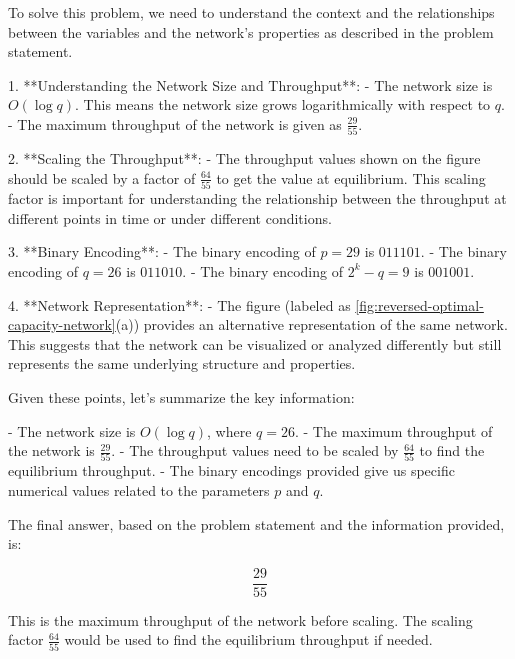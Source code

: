 To solve this problem, we need to understand the context and the relationships between the variables and the network's properties as described in the problem statement.

1. **Understanding the Network Size and Throughput**:
   - The network size is \( O(\log q) \). This means the network size grows logarithmically with respect to \( q \).
   - The maximum throughput of the network is given as \( \frac{29}{55} \).

2. **Scaling the Throughput**:
   - The throughput values shown on the figure should be scaled by a factor of \( \frac{64}{55} \) to get the value at equilibrium. This scaling factor is important for understanding the relationship between the throughput at different points in time or under different conditions.

3. **Binary Encoding**:
   - The binary encoding of \( p = 29 \) is \( 011101 \).
   - The binary encoding of \( q = 26 \) is \( 011010 \).
   - The binary encoding of \( 2^k - q = 9 \) is \( 001001 \).

4. **Network Representation**:
   - The figure (labeled as \cref{fig:reversed-optimal-capacity-network}(a)) provides an alternative representation of the same network. This suggests that the network can be visualized or analyzed differently but still represents the same underlying structure and properties.

Given these points, let's summarize the key information:

- The network size is \( O(\log q) \), where \( q = 26 \).
- The maximum throughput of the network is \( \frac{29}{55} \).
- The throughput values need to be scaled by \( \frac{64}{55} \) to find the equilibrium throughput.
- The binary encodings provided give us specific numerical values related to the parameters \( p \) and \( q \).

The final answer, based on the problem statement and the information provided, is:

\[
\boxed{\frac{29}{55}}
\]

This is the maximum throughput of the network before scaling. The scaling factor \( \frac{64}{55} \) would be used to find the equilibrium throughput if needed.